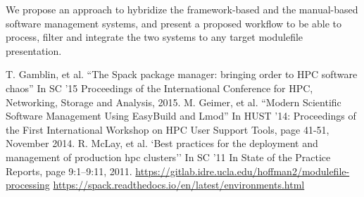 \documentclass[conference]{IEEEtran}
\begin{document}
We propose an approach to hybridize the framework-based and the manual-based software management systems, 
and present a proposed workflow to be able to process, filter and integrate the two systems to any target modulefile presentation. 

\begin{thebibliography}{00}
 T. Gamblin, et al. ``The Spack package manager: bringing order to HPC software chaos'' In SC ’15 Proceedings of the International Conference for HPC, Networking, Storage and Analysis, 2015.
 M. Geimer, et al. ``Modern Scientific Software Management Using EasyBuild and Lmod'' In HUST '14: Proceedings of the First International Workshop on HPC User Support Tools, page 41-51, November 2014.
 R. McLay, et al. `Best practices for the deployment and management of production hpc clusters'' In SC ’11 In State of the Practice Reports, page 9:1–9:11, 2011.
 \href{https://gitlab.idre.ucla.edu/hoffman2/modulefile-processing}{https://gitlab.idre.ucla.edu/hoffman2/modulefile-processing}
 \href{https://spack.readthedocs.io/en/latest/environments.html}{https://spack.readthedocs.io/en/latest/environments.html}
\end{thebibliography}
\end{document}
